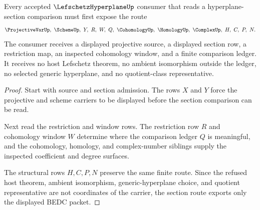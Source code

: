 \begin{theorem}
\label{thm:lefschetz-hyperplane-section-route}
Every accepted $\LefschetzHyperplaneUp$ consumer that reads a hyperplane-section comparison must first expose the route
$$
\ProjectiveVarUp,\ \SchemeUp,\ Y,\ R,\ W,\ Q,\ \CohomologyUp,\ \HomologyUp,\ \ComplexUp,\ H,\ C,\ P,\ N.
$$
The consumer receives a displayed projective source, a displayed section row, a restriction map, an inspected cohomology window, and a finite comparison ledger. It receives no host Lefschetz theorem, no ambient isomorphism outside the ledger, no selected generic hyperplane, and no quotient-class representative.
\end{theorem}
\begin{proof}
Start with source and section admission. The rows $X$ and $Y$ force the projective and scheme carriers to be displayed before the section comparison can be read.

Next read the restriction and window rows. The restriction row $R$ and cohomology window $W$ determine where the comparison ledger $Q$ is meaningful, and the cohomology, homology, and complex-number siblings supply the inspected coefficient and degree surfaces.

The structural rows $H,C,P,N$ preserve the same finite route. Since the refused host theorem, ambient isomorphism, generic-hyperplane choice, and quotient representative are not coordinates of the carrier, the section route exports only the displayed BEDC packet.
\end{proof}


\begin{closurestatus}{\LefschetzHyperplaneUp}
  \theoryclosure{\seedClosure}
  \formalstatus{\unformalizedV}
\end{closurestatus}
